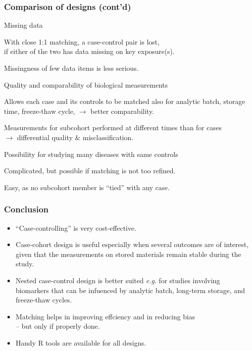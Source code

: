 \documentclass[12pt,dvipsnames,t,handout%
,aspectratio=169%
]{beamer}
\begin{document}
 \begin{frame}
 \frametitle{Comparison of designs (cont'd)}
 \pause
 \bi
 \item Missing data
 \pause
 \bi \item[NCC:]
   With close 1:1 matching, a case-control pair is lost, \\
  if either of the two has data missing on key exposure(s).
  \pause\medskip
  \item[CC:] Missingness of few data items is less serious.
  \ei 
  \pause
 \item Quality and comparability of biological measurements
 \pause
 \bi
 \item[NCC:] Allows 
 each case  and its controls to be matched also 
 for analytic batch, storage time, freeze-thaw cycle,  
    $\to$ better comparability. \pause\medskip
  \item[CC:] Measurements for subcohort 
  performed at different times than for cases \\ 
	$\to$  differential quality \& misclassification.
 \ei
 \pause
 \item  Possibility for studying many diseases with same controls
 \pause
 \bi
 \item[NCC:] Complicated, but possible if matching is not too refined.
 \medskip
 \item[CC:] Easy, as no subcohort member is ``tied'' with any case.
 \ei
 \ei
 
 \end{frame}
 

\begin{frame}
\frametitle{Conclusion}

\pause
\begin{itemize}
\item
``Case-controlling'' is very cost-effective.
\pause
\medskip
\item
 Case-cohort design is useful especially when several outcomes
are of interest, given that the measurements on stored
materials remain stable during the study.
\pause
\medskip
\item
 Nested case-control design is better suited \textit{e.g.}
 for studies involving biomarkers that can be infuenced by analytic batch,
long-term storage, and freeze-thaw cycles.
\pause
\medskip
\item
 Matching helps in improving effciency and in reducing bias \\
-- but only if properly done.
\pause
\medskip
\item
Handy R tools are available for all designs.

\end{itemize}

\end{frame}
\end{document}
